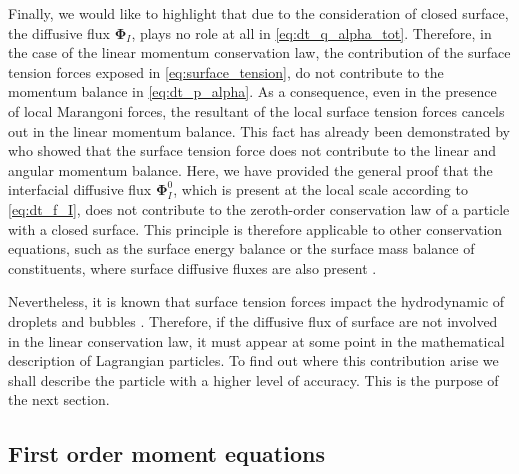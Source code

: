 Finally, we would like to highlight that  due to the consideration of closed surface, the diffusive flux $\mathbf{\Phi}_I$, plays no role at all in \ref{eq:dt_q_alpha_tot}.
Therefore, in the case of the linear momentum conservation law, the contribution of the surface tension forces exposed in \ref{eq:surface_tension}, do not contribute to the momentum balance in \ref{eq:dt_p_alpha}.
As a consequence, even in the presence of local Marangoni forces, the resultant of the local surface tension forces cancels out in the linear momentum balance.
This fact has already been demonstrated by \citet{hesla1993note} who showed that the surface tension force does not contribute to the linear and angular momentum balance. 
Here, we have provided the general proof that the interfacial diffusive flux $\mathbf{\Phi}_I^0$, which is present at the local scale according to \ref{eq:dt_f_I}, does not contribute to the zeroth-order conservation law of a particle with a closed surface.
This principle is therefore applicable to other conservation equations, such as the surface energy balance or the surface mass balance of constituents, where surface diffusive fluxes are also present \citep{bothe2022sharp,manikantan2020surfactant}. 

Nevertheless, it is known that surface tension forces impact the hydrodynamic of droplets and bubbles \citep{kentheswaran2022direct,pesci2018computational}. 
Therefore, if the diffusive flux of surface are not involved in the linear conservation law, it must appear at some point in the mathematical description of Lagrangian particles. 
To find out where this contribution arise we shall describe the particle with a higher level of accuracy. 
This is the purpose of the next section. 

\subsection{First order moment equations}

